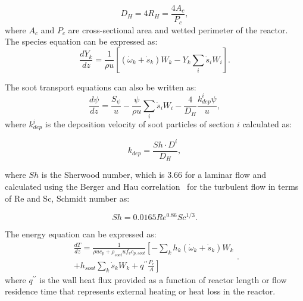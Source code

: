 \begin{equation}
	D_H = 4 R_H = \frac{4 A_c}{P_c}
	\label{eqn:RDHpfr},
\end{equation}
\noindent where $A_c$ and $P_c$ are cross-sectional area and wetted perimeter of the reactor.
The species equation can be expressed as:
\begin{equation}
	\frac{d Y_k}{d z}=\frac{1}{\rho u}\left[\left(\dot{\omega}_k+\dot{s}_k\right) W_k-Y_k \sum_i \dot{s}_i W_i\right]
	\label{eqn:speciespfr}.
\end{equation}

 The soot transport equations can also be written as:
\begin{equation}
	\frac{d \psi}{d z}=
	\frac{S_{\psi}}{u}
	-\frac{\psi}{\rho u}\sum_i \dot{s}_i W_i
	-\frac{4}{D_H}\frac{k^i_{dep}\psi}{u},
	\label{eqn:sootpfr}
\end{equation}
\noindent where $k^i_{dep}$ is the deposition velocity of soot particles of section $i$ calculated as:

\begin{equation}
	k_{dep}=
	\frac{Sh\cdot D^i}{D_H},
	\label{eqn:kdep}
\end{equation}

\noindent where $Sh$ is the Sherwood number, which is 3.66 for a laminar flow and calculated using the Berger and Hau correlation~\citep{berger1977mass} for the turbulent flow in terms of Re and Sc, Schmidt number as:

\begin{equation}
	Sh=
	0.0165Re^{0.86} Sc^{1/3}
	\label{eqn:shdep}.
\end{equation}

 The energy equation can be expressed as:
\begin{equation}
	\begin{split}
		\frac{d T}{d z}=
		\frac{1}{\rho u c_p+\rho_{soot} u f_v 	c_{p,soot}}
		\left[
			-\sum_k h_k
			\left(
			\dot{\omega}_k+\dot{s}_k
			\right) W_k
		\right. \\
		\left.
			+h_{soot}\sum_k \dot{s}_k W_k
			+q^{\prime \prime}\frac{P_c}{A}
		\right]
	\end{split}
	\label{eqn:energypfr}.
\end{equation}
\noindent where $q^{\prime \prime}$ is the wall heat flux provided as a function of reactor length or flow residence time that represents external heating or heat loss in the reactor.


